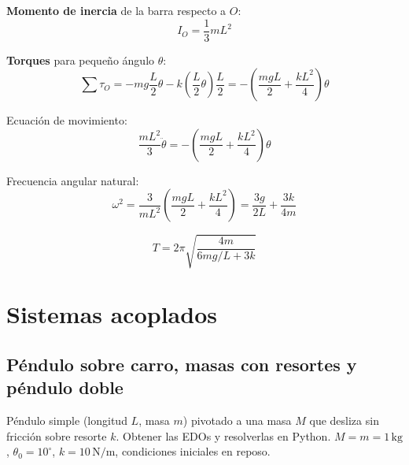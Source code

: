 \documentclass[12pt, a4paper, oneside]{book}
\newcommand{\Nm}{\,\text{N/m}}
\newcommand{\kg}{\,\text{kg}}
\begin{document}
\begin{solucion}
\textbf{Momento de inercia} de la barra respecto a $O$:
\[
  I_{O} = \dfrac{1}{3}mL^{2}
\]

\textbf{Torques} para peque\~no \'angulo $\theta$:
\[
  \sum\tau_{O} = -mg\dfrac{L}{2}\theta - k\!\left(\dfrac{L}{2}\theta\right)\dfrac{L}{2}
               = -\left(\dfrac{mgL}{2} + \dfrac{kL^{2}}{4}\right)\theta
\]

Ecuaci\'on de movimiento:
\[
  \dfrac{mL^{2}}{3}\ddot{\theta} = -\left(\dfrac{mgL}{2}+\dfrac{kL^{2}}{4}\right)\theta
\]

Frecuencia angular natural:
\[
  \omega^{2} = \dfrac{3}{mL^{2}}\!\left(\dfrac{mgL}{2}+\dfrac{kL^{2}}{4}\right)
             = \dfrac{3g}{2L} + \dfrac{3k}{4m}
\]

\[
  \boxed{T = 2\pi\sqrt{\dfrac{4m}{6mg/L + 3k}}}
\]
\end{solucion}

\chapter{Sistemas acoplados}

\section{P\'endulo sobre carro, masas con resortes y p\'endulo doble}

\begin{problema}[title={Problema~34}]
P\'endulo simple (longitud $L$, masa $m$) pivotado a una masa $M$ que desliza
sin fricci\'on sobre resorte $k$. Obtener las EDOs y resolverlas en Python.
$M = m = 1\kg$, $\theta_{0} = 10^\circ$, $k = 10\Nm$, condiciones
iniciales en reposo.
\end{problema}
\end{document}
